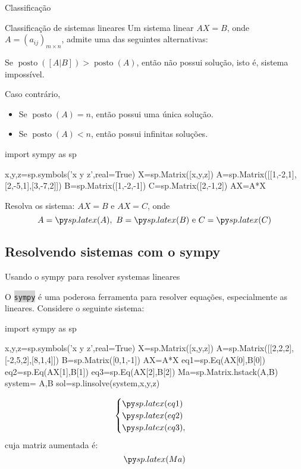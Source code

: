 \begin{frame}[label=sistemas]{Classificação}
\begin{block}{Classificação de sistemas lineares}
Um sistema linear $AX=B$, onde $A=(a_{ij})_{m\times n}$, admite uma das seguintes alternativas:
\medskip

Se $\operatorname{posto}([A|B])>\operatorname{posto}(A)$, então {\color{red} não possui solução}, isto é, sistema impossível.

\medskip
Caso contrário, 
\begin{itemize}
\item Se $\operatorname{posto}(A)=n$, então possui {\color{blue}uma única} solução.

\item Se $\operatorname{posto}(A)<n$, então possui {\color{blue}infinitas} soluções.
\end{itemize}
\end{block}
\end{frame}



\begin{frame}[label=sistemas,fragile=singleslide]{ }


\begin{pycode}
import sympy as sp

x,y,z=sp.symbols('x y z',real=True)
X=sp.Matrix([x,y,z])
A=sp.Matrix([[1,-2,1],[2,-5,1],[3,-7,2]])
B=sp.Matrix([1,-2,-1])
C=sp.Matrix([2,-1,2])
AX=A*X
\end{pycode}

\begin{casa}
Resolva os sistema: $AX=B$ e $AX=C$, onde 
\[A=\pyl{A},\ B=\pyl{B} \text{ e } C=\pyl{C}\]
\end{casa}

\end{frame}



\subsection*{Resolvendo sistemas com o sympy}
\begin{frame}[label=sistemas,fragile=singleslide]{Usando o sympy para resolver systemas lineares}

O {\colorbox{lightgray}{\texttt{sympy}}} é uma poderosa ferramenta para resolver equações, especialmente as lineares. Considere o seguinte sistema:
\begin{pycode}
import sympy as sp

x,y,z=sp.symbols('x y z',real=True)
X=sp.Matrix([x,y,z])
A=sp.Matrix([[2,2,2],[-2,5,2],[8,1,4]])
B=sp.Matrix([0,1,-1])
AX=A*X
eq1=sp.Eq(AX[0],B[0])
eq2=sp.Eq(AX[1],B[1])
eq3=sp.Eq(AX[2],B[2])
Ma=sp.Matrix.hstack(A,B)
system= A,B
sol=sp.linsolve(system,x,y,z)
\end{pycode}
\[\begin{cases}
\pyl{eq1}\\
\pyl{eq2}\\
\pyl{eq3},
\end{cases}\]
cuja matriz aumentada é:
\[
\pyl{Ma}
\]
\end{frame}


